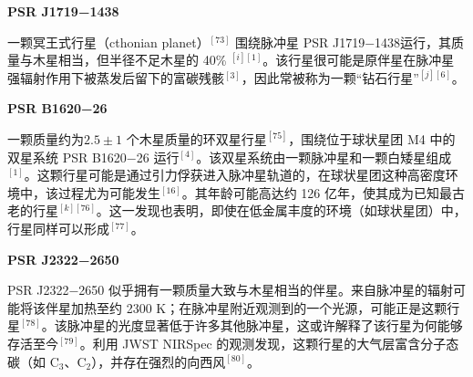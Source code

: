 \textbf{PSR J1719−1438}

一颗冥王式行星（cthonian planet）$^{[73]}$ 围绕脉冲星 PSR J1719−1438运行，其质量与木星相当，但半径不足木星的 40\% $^{[i][1]}$。该行星很可能是原伴星在脉冲星强辐射作用下被蒸发后留下的富碳残骸$^{[3]}$，因此常被称为一颗“钻石行星”$^{[j][6]}$。

\textbf{PSR B1620−26}

一颗质量约为$2.5\pm1$ 个木星质量的环双星行星$^{[75]}$，围绕位于球状星团 M4 中的双星系统 PSR B1620−26 运行$^{[4]}$。该双星系统由一颗脉冲星和一颗白矮星组成$^{[1]}$。这颗行星可能是通过引力俘获进入脉冲星轨道的，在球状星团这种高密度环境中，该过程尤为可能发生$^{[16]}$。其年龄可能高达约 126 亿年，使其成为已知最古老的行星$^{[k][76]}$。这一发现也表明，即使在低金属丰度的环境（如球状星团）中，行星同样可以形成$^{[77]}$。

\textbf{PSR J2322−2650}

PSR J2322−2650 似乎拥有一颗质量大致与木星相当的伴星。来自脉冲星的辐射可能将该伴星加热至约 2300 K；在脉冲星附近观测到的一个光源，可能正是这颗行星$^{[78]}$。该脉冲星的光度显著低于许多其他脉冲星，这或许解释了该行星为何能够存活至今$^{[79]}$。利用 JWST NIRSpec 的观测发现，这颗行星的大气层富含分子态碳（如 C$_3$、C$_2$），并存在强烈的向西风$^{[80]}$。
